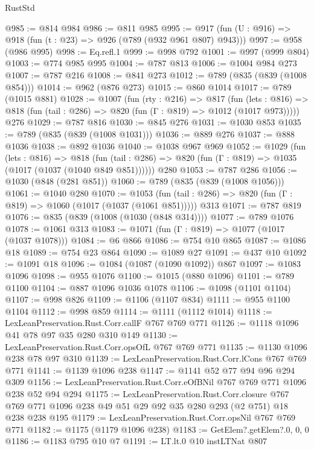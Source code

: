 \begin{lexlean}{RustStd}
\begin{coremodule}
@985 := @814 @984
@986 := @811 @985
@995 := @917 (fun (U : @916) => @918 (fun (t : @23) => @926 (@789 (@932 @961 @807) @943)))
@997 := @958 (@986 @995)
@998 := Eq.refl.{1}
@999 := @998 @792
@1001 := @997 (@999 @804)
@1003 := @774 @985 @995
@1004 := @787 @813
@1006 := @1004 @984 @273
@1007 := @787 @216
@1008 := @841 @273
@1012 := @789 (@835 (@839 (@1008 @854)))
@1014 := @962 (@876 @273)
@1015 := @860 @1014
@1017 := @789 (@1015 @881)
@1028 := @1007
    (fun (rty : @216) =>
    @817
      (fun (lets : @816) =>
      @818 (fun (tail : @286) => @820 (fun (Γ : @819) => @1012 (@1017 @973)))))
    @276
@1029 := @787 @816
@1030 := @845 @276
@1031 := @1030 @853
@1035 := @789 (@835 (@839 (@1008 @1031)))
@1036 := @889 @276
@1037 := @888 @1036
@1038 := @892 @1036
@1040 := @1038 @967 @969
@1052 := @1029
    (fun (lets : @816) =>
    @818 (fun (tail : @286) => @820 (fun (Γ : @819) => @1035 (@1017 (@1037 (@1040 @849 @851))))))
    @280
@1053 := @787 @286
@1056 := @1030 (@848 (@281 @851))
@1060 := @789 (@835 (@839 (@1008 @1056)))
@1061 := @1040 @280
@1070 := @1053
    (fun (tail : @286) => @820 (fun (Γ : @819) => @1060 (@1017 (@1037 (@1061 @851)))))
    @313
@1071 := @787 @819
@1076 := @835 (@839 (@1008 (@1030 (@848 @314))))
@1077 := @789 @1076
@1078 := @1061 @313
@1083 := @1071 (fun (Γ : @819) => @1077 (@1017 (@1037 @1078)))
@1084 := @6 @866
@1086 := @754 @10 @865
@1087 := @1086 @18
@1089 := @754 @23 @864
@1090 := @1089 @27
@1091 := @437 @10
@1092 := @1091 @18
@1096 := @1084 (@1087 (@1090 @1092)) @867
@1097 := @1083 @1096
@1098 := @955 @1076
@1100 := @1015 (@880 @1096)
@1101 := @789 @1100
@1104 := @887 @1096 @1036 @1078
@1106 := @1098 (@1101 @1104)
@1107 := @998 @826
@1109 := @1106 (@1107 @834)
@1111 := @955 @1100 @1104
@1112 := @998 @859
@1114 := @1111 (@1112 @1014)
@1118 := LexLeanPreservation.Rust.Corr.callF @767 @769 @771
@1126 := @1118 @1096 @41 @78 @97 @35 @280 @310 @149
@1130 := LexLeanPreservation.Rust.Corr.opsOfL @767 @769 @771
@1135 := @1130 @1096 @238 @78 @97 @310
@1139 := LexLeanPreservation.Rust.Corr.lCons @767 @769 @771
@1141 := @1139 @1096 @238
@1147 := @1141 @52 @77 @94 @96 @294 @309
@1156 := LexLeanPreservation.Rust.Corr.eOfBNil @767 @769 @771 @1096 @238 @52 @94 @294
@1175 := LexLeanPreservation.Rust.Corr.closure
    @767
    @769
    @771
    @1096
    @238
    @49
    @51
    @29
    @92
    @35
    @280
    @293
    (@2 @751)
    @18
    @238
    @238
    @195
@1179 := LexLeanPreservation.Rust.Corr.opsNil @767 @769 @771
@1182 := @1175 (@1179 @1096 @238)
@1183 := GetElem?.getElem?.{0, 0, 0}
@1186 := @1183 @795 @10 @7
@1191 := LT.lt.{0} @10 instLTNat @807

\end{coremodule}
\end{lexlean}
